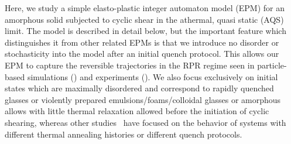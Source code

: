 \documentclass[%
 prl,
 amsmath,amssymb,
%
 reprint,%
]{revtex4-1}
\begin{document}
Here, we study a simple elasto-plastic integer automaton model (EPM) for an amorphous solid subjected to cyclic shear in the athermal, quasi static (AQS) limit.  
The model is described in detail below, but the important feature which distinguishes it from other related EPMs is that we introduce no disorder or stochasticity into the model after an initial quench protocol.
This allows our EPM to capture the reversible trajectories in the RPR regime seen in particle-based simulations (\cite{Regev}) and experiments (\cite{Ohern,Keim}). 
We also focus exclusively on initial states which are maximally disordered and correspond to rapidly quenched glasses or violently prepared emulsions/foams/colloidal glasses or amorphous allows with little thermal relaxation allowed before the initiation of cyclic shearing, whereas other studies~\cite{Muhitin,Kirsten,Sastry} have focused on the behavior of systems with different thermal annealing histories or different quench protocols.
\end{document}
